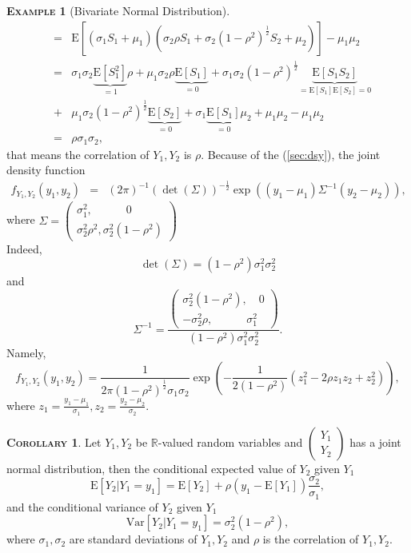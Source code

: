 \documentclass[a4paper, twoside, 11pt]{article}
\theoremstyle{definition}
\newtheorem{corollary}[definition]{\scshape Corollary}
\newtheorem{example}[definition]{\scshape Example}
\newcommand{\brkt}[1]{\left({#1} \right)}
\begin{document}
\begin{example}[Bivariate Normal Distribution]
\begin{eqnarray*}
						   &=& \mathrm{E}[(\sigma_1 S_1 + \mu_1)(\sigma_2\rho S_1 + \sigma_2(1-\rho^2)^{\frac{1}{2}}S_2 + \mu_2)] - \mu_1\mu_2\\
						   &=& \sigma_1\sigma_2\underbrace{\mathrm{E}[S_1^2]}_{=1}\rho + \mu_1\sigma_2\rho\underbrace{\mathrm{E}[S_1]}_{=0} +
						   \sigma_1\sigma_2(1-\rho^2)^{\frac{1}{2}}\underbrace{\mathrm{E}[S_1S_2]}_{=\mathrm{E}[S_1]\mathrm{E}[S_2]=0} \\
						   &+& \mu_1\sigma_2(1-\rho^2)^{\frac{1}{2}}\underbrace{\mathrm{E}[S_2]}_{=0} + \sigma_1\underbrace{\mathrm{E}[S_1]}_{=0}\mu_2 + \mu_1\mu_2 - \mu_1\mu_2\\
						   &=& \rho\sigma_1\sigma_2,
	  \end{eqnarray*}
	  that means the correlation of $Y_1, Y_2$ is $\rho$.
	  Because of the (\ref{sec:dsy}), the joint density function
	  \begin{eqnarray*}
		f_{Y_1, Y_2}(y_1, y_2) &=& (2\pi)^{-1} (\det(\Sigma))^{-\frac{1}{2}} \exp\brkt{(y_1 - \mu_1) \Sigma^{-1} (y_2 - \mu_2)},
	  \end{eqnarray*}
	  where $\Sigma =\left(
	  \begin{array}{l}
		\sigma_1^2, \hspace{3em}0 \\
		\sigma_2^2\rho^2, \sigma_2^2(1-\rho^2)
	  \end{array}
	\right)
   $\\
   Indeed, 
   $$
	  \det(\Sigma) = (1-\rho^2)\sigma_1^2\sigma_2^2
   $$ and 
   $$
   \Sigma^{-1} = \frac{
	 \left(
	  \begin{array}{l}
		\sigma_2^2(1-\rho^2), \hspace{1em}0 \\
		-\sigma_2^2\rho,\hspace{3em}\sigma_1^2
	  \end{array}
	\right)}
	{\displaystyle (1-\rho^2)\sigma_1^2\sigma_2^2}.
	$$
   Namely,
   \begin{equation}
	 f_{Y_1, Y_2}(y_1, y_2) = \frac{1}{2\pi(1 - \rho^2)^{\frac{1}{2}}\sigma_1\sigma_2}\exp\brkt{-\frac{1}{2(1-\rho^2)}(z_1^2 - 2\rho z_1 z_2 + z_2^2)},
	 \label{sec:jdt}
   \end{equation}
   where $z_1 = \frac{y_1-\mu_1}{\sigma_1}, z_2=\frac{y_2-\mu_2}{\sigma_2}$.
  \end{example}

  \begin{corollary}
	Let $Y_1, Y_2$ be $\mathbb{R}$-valued random variables and $\left(
	  \begin{array}{c}
		Y_1 \\
		Y_2
	  \end{array}
	  \right)$  has a joint normal distribution, then the conditional expected value of $Y_2$ given $Y_1$
	  $$
	  \mathrm{E}[Y_2| Y_1=y_1] = \mathrm{E}[Y_2] + \rho (y_1 - \mathrm{E}[Y_1])\frac{\sigma_2}{\sigma_1},
	  $$
	  and the conditional variance of $Y_2$ given $Y_1$
	  $$
		  \mathrm{Var}[Y_2| Y_1 = y_1] = \sigma_2^2 (1 - \rho^2),
	  $$
	  where $\sigma_1, \sigma_2$ are standard deviations of $Y_1, Y_2$ and $\rho$ is the correlation of $Y_1, Y_2$.
	  \label{sec:condi}
  \end{corollary}
\end{document}
